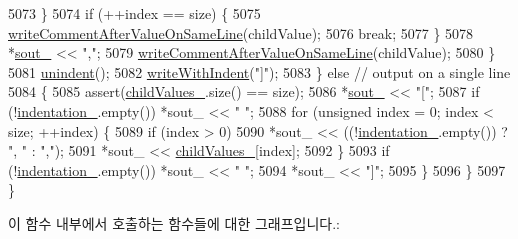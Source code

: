 \begin{DoxyCode}
5073         \}
5074         \textcolor{keywordflow}{if} (++index == size) \{
5075           \hyperlink{struct_json_1_1_built_styled_stream_writer_a89625b134fce0255263ca40e6125742b}{writeCommentAfterValueOnSameLine}(childValue);
5076           \textcolor{keywordflow}{break};
5077         \}
5078         *\hyperlink{class_json_1_1_stream_writer_a4f5603d4228a9fa46a42cb44e5234d9b}{sout\_} << \textcolor{stringliteral}{","};
5079         \hyperlink{struct_json_1_1_built_styled_stream_writer_a89625b134fce0255263ca40e6125742b}{writeCommentAfterValueOnSameLine}(childValue);
5080       \}
5081       \hyperlink{struct_json_1_1_built_styled_stream_writer_a0da6c6f603e00c8c6e38af553edd8c55}{unindent}();
5082       \hyperlink{struct_json_1_1_built_styled_stream_writer_a6e80e1a0d5f64df2ec48c3c3b1284990}{writeWithIndent}(\textcolor{stringliteral}{"]"});
5083     \} \textcolor{keywordflow}{else} \textcolor{comment}{// output on a single line}
5084     \{
5085       assert(\hyperlink{struct_json_1_1_built_styled_stream_writer_a47d562d7874c5b1e68995bd62f575792}{childValues\_}.size() == size);
5086       *\hyperlink{class_json_1_1_stream_writer_a4f5603d4228a9fa46a42cb44e5234d9b}{sout\_} << \textcolor{stringliteral}{"["};
5087       \textcolor{keywordflow}{if} (!\hyperlink{struct_json_1_1_built_styled_stream_writer_aaa4cbad91428ceca37cbabfc2a17a92d}{indentation\_}.empty()) *sout\_ << \textcolor{stringliteral}{" "};
5088       \textcolor{keywordflow}{for} (\textcolor{keywordtype}{unsigned} index = 0; index < size; ++index) \{
5089         \textcolor{keywordflow}{if} (index > 0)
5090           *sout\_ << ((!\hyperlink{struct_json_1_1_built_styled_stream_writer_aaa4cbad91428ceca37cbabfc2a17a92d}{indentation\_}.empty()) ? \textcolor{stringliteral}{", "} : \textcolor{stringliteral}{","});
5091         *sout\_ << \hyperlink{struct_json_1_1_built_styled_stream_writer_a47d562d7874c5b1e68995bd62f575792}{childValues\_}[index];
5092       \}
5093       \textcolor{keywordflow}{if} (!\hyperlink{struct_json_1_1_built_styled_stream_writer_aaa4cbad91428ceca37cbabfc2a17a92d}{indentation\_}.empty()) *sout\_ << \textcolor{stringliteral}{" "};
5094       *sout\_ << \textcolor{stringliteral}{"]"};
5095     \}
5096   \}
5097 \}
\end{DoxyCode}
이 함수 내부에서 호출하는 함수들에 대한 그래프입니다.\+:
\nopagebreak

